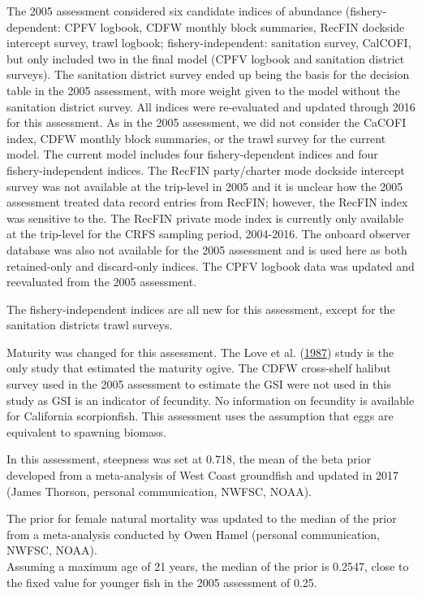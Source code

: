 \documentclass[12pt,]{article}
\begin{document}
The 2005 assessment considered six candidate indices of abundance
(fishery-dependent: CPFV logbook, CDFW monthly block summaries, RecFIN
dockside intercept survey, trawl logbook; fishery-independent:
sanitation survey, CalCOFI, but only included two in the final model
(CPFV logbook and sanitation district surveys). The sanitation district
survey ended up being the basis for the decision table in the 2005
assessment, with more weight given to the model without the sanitation
district survey. All indices were re-evaluated and updated through 2016
for this assessment. As in the 2005 assessment, we did not consider the
CaCOFI index, CDFW monthly block summaries, or the trawl survey for the
current model. The current model includes four fishery-dependent indices
and four fishery-independent indices. The RecFIN party/charter mode
dockside intercept survey was not available at the trip-level in 2005
and it is unclear how the 2005 assessment treated data record entries
from RecFIN; however, the RecFIN index was sensitive to the. The RecFIN
private mode index is currently only available at the trip-level for the
CRFS sampling period, 2004-2016. The onboard observer database was also
not available for the 2005 assessment and is used here as both
retained-only and discard-only indices. The CPFV logbook data was
updated and reevaluated from the 2005 assessment.

The fishery-independent indices are all new for this assessment, except
for the sanitation districts trawl surveys.

Maturity was changed for this assessment. The Love et al.
(\protect\hyperlink{ref-Love1987}{1987}) study is the only study that
estimated the maturity ogive. The CDFW cross-shelf halibut survey used
in the 2005 assessment to estimate the GSI were not used in this study
as GSI is an indicator of fecundity. No information on fecundity is
available for California scorpionfish. This assessment uses the
assumption that eggs are equivalent to spawning biomass.

In this assessment, steepness was set at 0.718, the mean of the beta
prior developed from a meta-analysis of West Coast groundfish and
updated in 2017 (James Thorson, personal communication, NWFSC, NOAA).

The prior for female natural mortality was updated to the median of the
prior from a meta-analysis conducted by Owen Hamel (personal
communication, NWFSC, NOAA).\\
Assuming a maximum age of 21 years, the median of the prior is 0.2547,
close to the fixed value for younger fish in the 2005 assessment of
0.25.
\end{document}
